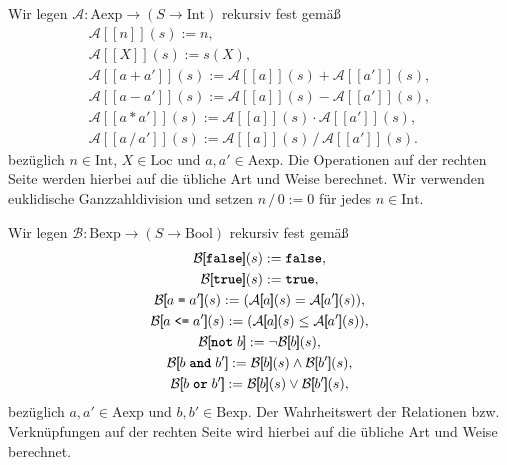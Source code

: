 \documentclass[8pt,fleqn,aspectratio=169]{beamer}
\newcommand{\kw}[1]{\textbf{\texttt{#1}}}
\newcommand{\code}[1]{{\texttt{#1}}}
\newcommand{\qb}[1]{[\!\![#1]\!\!]}
\newcommand{\Bool}{\mathrm{Bool}}
\newcommand{\Int}{\mathrm{Int}}
\newcommand{\Loc}{\mathrm{Loc}}
\newcommand{\Aexp}{\mathrm{Aexp}}
\newcommand{\Bexp}{\mathrm{Bexp}}
\newcommand{\evA}{\mathcal A}
\newcommand{\evB}{\mathcal B}
\begin{document}
\begin{frame}
Wir legen $\evA\colon\Aexp\to (S\to\Int)$ rekursiv fest gemäß
\begin{gather*}
\evA\qb{n}(s) := n,\\
\evA\qb{X}(s) := s(X),\\
\evA\qb{a+a'}(s) := \evA\qb{a}(s) + \evA\qb{a'}(s),\\
\evA\qb{a-a'}(s) := \evA\qb{a}(s) - \evA\qb{a'}(s),\\
\evA\qb{a*a'}(s) := \evA\qb{a}(s) \cdot \evA\qb{a'}(s),\\
\evA\qb{a\,/\,a'}(s) := \evA\qb{a}(s)\,/\, \evA\qb{a'}(s).
\end{gather*}
bezüglich $n\in\Int$, $X\in\Loc$ und $a,a'\in\Aexp$.
Die Operationen auf der rechten Seite werden hierbei auf die übliche
Art und Weise berechnet. Wir verwenden euklidische Ganzzahldivision
und setzen $n\,/\,0:=0$ für jedes $n\in\Int$.
\end{frame}

\begin{frame}
Wir legen $\evB\colon\Bexp\to (S\to\Bool)$ rekursiv fest gemäß
\begin{gather*}
\evB\qb{\kw{false}}(s) := \kw{false},\\
\evB\qb{\kw{true}}(s) := \kw{true},\\
\evB\qb{a \;\code{=}\; a'}(s) := (\evA\qb{a}(s) = \evA\qb{a'}(s)),\\
\evB\qb{a \;\code{<=}\; a'}(s) := (\evA\qb{a}(s)\le \evA\qb{a'}(s)),\\
\evB\qb{\kw{not}\;b} := \lnot\evB\qb{b}(s),\\
\evB\qb{b\;\kw{and}\;b'} := \evB\qb{b}(s)\land\evB\qb{b'}(s),\\
\evB\qb{b\;\kw{or}\;b'} := \evB\qb{b}(s)\lor\evB\qb{b'}(s),
\end{gather*}
bezüglich $a,a'\in\Aexp$ und $b,b'\in\Bexp$. Der Wahrheitswert der
Relationen bzw. Verknüpfungen auf der rechten Seite wird hierbei auf die
übliche Art und Weise berechnet.
\end{frame}
\end{document}
